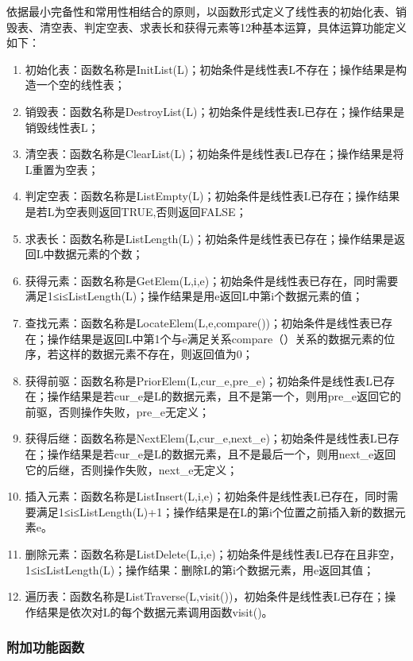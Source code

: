 \documentclass[supercite]{Experimental_Report}
\theoremstyle{definition}
\begin{document}
依据最小完备性和常用性相结合的原则，以函数形式定义了线性表的初始化表、销毁表、清空表、判定空表、求表长和获得元素等12种基本运算，具体运算功能定义如下：

\begin{enumerate}
    \item 初始化表：函数名称是InitList(L)；初始条件是线性表L不存在；操作结果是构造一个空的线性表；
    \item 销毁表：函数名称是DestroyList(L)；初始条件是线性表L已存在；操作结果是销毁线性表L；
    \item 清空表：函数名称是ClearList(L)；初始条件是线性表L已存在；操作结果是将L重置为空表；
    \item 判定空表：函数名称是ListEmpty(L)；初始条件是线性表L已存在；操作结果是若L为空表则返回TRUE,否则返回FALSE；
    \item 求表长：函数名称是ListLength(L)；初始条件是线性表已存在；操作结果是返回L中数据元素的个数；
    \item 获得元素：函数名称是GetElem(L,i,e)；初始条件是线性表已存在，同时需要满足1≤i≤ListLength(L)；操作结果是用e返回L中第i个数据元素的值；
    \item 查找元素：函数名称是LocateElem(L,e,compare())；初始条件是线性表已存在；操作结果是返回L中第1个与e满足关系compare（）关系的数据元素的位序，若这样的数据元素不存在，则返回值为0；
	\item 获得前驱：函数名称是PriorElem(L,cur\_e,pre\_e)；初始条件是线性表L已存在；操作结果是若cur\_e是L的数据元素，且不是第一个，则用pre\_e返回它的前驱，否则操作失败，pre\_e无定义；
	\item 获得后继：函数名称是NextElem(L,cur\_e,next\_e)；初始条件是线性表L已存在；操作结果是若cur\_e是L的数据元素，且不是最后一个，则用next\_e返回它的后继，否则操作失败，next\_e无定义；
	\item 插入元素：函数名称是ListInsert(L,i,e)；初始条件是线性表L已存在，同时需要满足1≤i≤ListLength(L)+1；操作结果是在L的第i个位置之前插入新的数据元素e。
	\item 删除元素：函数名称是ListDelete(L,i,e)；初始条件是线性表L已存在且非空，1≤i≤ListLength(L)；操作结果：删除L的第i个数据元素，用e返回其值；
	\item 遍历表：函数名称是ListTraverse(L,visit())，初始条件是线性表L已存在；操作结果是依次对L的每个数据元素调用函数visit()。
\end{enumerate}

\subsubsection{附加功能函数}
\end{document}
